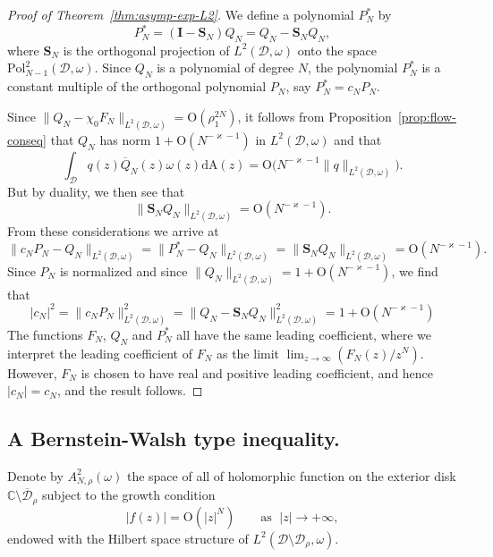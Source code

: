 \documentclass{amsart}
\newcommand{\be}{\begin{equation}}
\newcommand{\ee}{\end{equation}}
\newcommand{\C}{\mathbb{C}}
\newcommand{\calD}{\mathcal{D}}
\newcommand{\diffA}{\mathrm{dA}}
\newcommand{\Sop}{\mathbf{S}}
\newcommand{\Iop}{\mathbf{I}}
\theoremstyle{definition}
\theoremstyle{remark}
\newcommand{\Ordo}{\mathrm{O}}
\numberwithin{equation}{subsection}
\begin{document}
\begin{proof}[Proof of Theorem~\ref{thm:asymp-exp-L2}]
We define a polynomial $P_N^*$ by 
\be\label{eq:PN-ast}
P_N^*=(\Iop-\Sop_{N})Q_N=Q_N-\Sop_{N} Q_N,
\ee
where $\Sop_N$ is the orthogonal projection of $L^2(\calD,\omega)$
onto the space $\mathrm{Pol}_{N-1}^2(\calD,\omega)$.
Since $Q_N$ is a polynomial of degree $N$, the polynomial 
$P_N^*$ is a constant multiple of
the orthogonal polynomial $P_N$, say $P_N^*=c_NP_N$.

Since $\lVert Q_N-\chi_0 F_N\rVert_{L^2(\calD,\omega)}=\Ordo(\rho_1^{2N})$,
it follows from Proposition~\ref{prop:flow-conseq} that $Q_N$ has norm
$1+\Ordo(N^{-\varkappa-1})$ in $L^2(\calD,\omega)$ and that
\be
\int_{\calD}q(z)\overline{Q}_N(z)\omega(z)\diffA(z)
=\Ordo\big(N^{-\varkappa-1}\lVert q\rVert_{L^2(\calD,\omega)}\big).
\ee
But by duality, we then see that 
\be
\lVert \Sop_N Q_N\rVert_{L^2(\calD,\omega)}
=\Ordo(N^{-\varkappa-1}).
\ee
From these considerations we arrive at
\be
\lVert c_N P_N-Q_N\rVert_{L^2(\calD,\omega)}=\lVert P_N^*-Q_N\rVert_{L^2(\calD,\omega)}=
\lVert \Sop_NQ_N\rVert_{L^2(\calD,\omega)}=\Ordo(N^{-\varkappa-1}).
\ee
Since $P_N$ is normalized and since 
$\lVert Q_N\rVert_{L^2(\calD,\omega)}=1+\Ordo(N^{-\varkappa-1})$, we find that
\be
|c_N|^2=\lVert c_NP_N\rVert_{L^2(\calD,\omega)}^2
=\lVert Q_N-\Sop_NQ_N\rVert_{L^2(\calD,\omega)}^2
=1+\Ordo(N^{-\varkappa-1})
\ee
The functions $F_N$, $Q_N$ and $P_N^*$ all have the same leading coefficient,
where we interpret the leading coefficient of $F_N$ as the limit
$\lim_{z\to\infty}(F_N(z)/z^N)$.
However, $F_N$ is chosen to have real and positive leading coefficient, 
and hence $|c_N|=c_N$, and the result follows. 
\end{proof}




\subsection{A Bernstein-Walsh type inequality.}
\label{ss:pointwise}
Denote by $A^2_{N,\rho}(\omega)$ the space of all
of holomorphic function on the exterior disk 
$\C\setminus\overline{\calD}_\rho$ subject to the growth condition
\be
|f(z)|=\Ordo(|z|^N)\qquad\text{as }\;|z|\to+\infty,
\ee
endowed with the Hilbert space structure of $L^2(\calD\setminus\calD_\rho,\omega)$.
\end{document}
